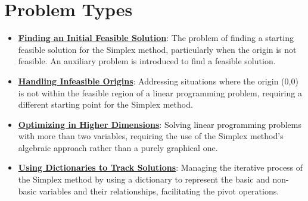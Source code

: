 \documentclass{article}%
\begin{document}
%
\section{Problem Types}%
\label{sec:ProblemTypes}%
\begin{itemize}[leftmargin=*]%
\item \href{https://www.math.purdue.edu/~yipn/421/2024-08-27-ExSimplex.pdf#page=32}{\textbf{Finding an Initial Feasible Solution}}: The problem of finding a starting feasible solution for the Simplex method, particularly when the origin is not feasible. An auxiliary problem is introduced to find a feasible solution. %
\item \href{https://www.math.purdue.edu/~yipn/421/2024-08-27-ExSimplex.pdf#page=30}{\textbf{Handling Infeasible Origins}}: Addressing situations where the origin (0,0) is not within the feasible region of a linear programming problem, requiring a different starting point for the Simplex method. %
\item \href{https://www.math.purdue.edu/~yipn/421/2024-08-27-ExSimplex.pdf#page=17}{\textbf{Optimizing in Higher Dimensions}}: Solving linear programming problems with more than two variables, requiring the use of the Simplex method's algebraic approach rather than a purely graphical one. %
\item \href{https://www.math.purdue.edu/~yipn/421/2024-08-27-ExSimplex.pdf#page=26}{\textbf{Using Dictionaries to Track Solutions}}: Managing the iterative process of the Simplex method by using a dictionary to represent the basic and non-basic variables and their relationships, facilitating the pivot operations. %
\end{itemize}

%
\end{document}

